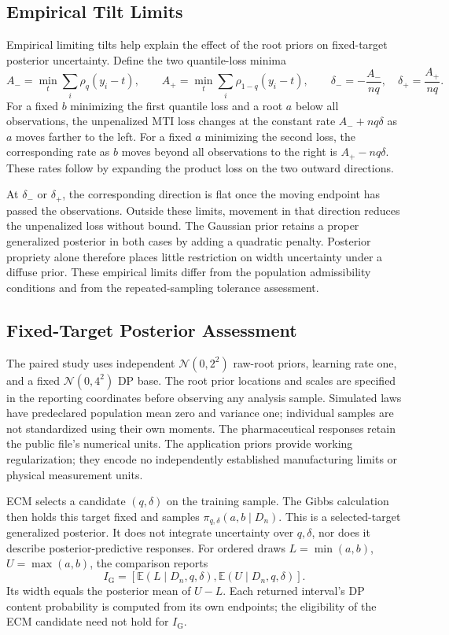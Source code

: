 \documentclass[11pt]{article}
\newcommand{\E}{\mathbb{E}}
\newcommand{\Normal}{\mathcal{N}}
\begin{document}
\subsection{Empirical Tilt Limits}
\label{sec:supp-mti-empirical-limits}

Empirical limiting tilts help explain the effect of the root priors on
fixed-target posterior uncertainty. Define the two quantile-loss minima
\[
A_- = \min_t\sum_i\rho_q(y_i-t),\qquad
A_+ = \min_t\sum_i\rho_{1-q}(y_i-t),\qquad
\delta_-=-\frac{A_-}{nq},\quad
\delta_+=\frac{A_+}{nq}.
\]
For a fixed \(b\) minimizing the first quantile loss and a root \(a\)
below all observations, the unpenalized MTI loss changes at the constant
rate \(A_-+nq\delta\) as \(a\) moves farther to the left. For a fixed
\(a\) minimizing the second loss, the corresponding rate as \(b\) moves
beyond all observations to the right is \(A_+-nq\delta\). These rates
follow by expanding the product loss on the two outward directions.

At \(\delta_-\) or \(\delta_+\), the corresponding direction is flat
once the moving endpoint has passed the observations. Outside these
limits, movement in that direction reduces the unpenalized loss without
bound. The Gaussian prior retains a proper generalized posterior in both
cases by adding a quadratic penalty. Posterior propriety alone therefore
places little restriction on width uncertainty under a diffuse prior.
These empirical limits differ from the population admissibility conditions
and from the repeated-sampling tolerance assessment.

\subsection{Fixed-Target Posterior Assessment}
\label{sec:supp-mti-posterior-assessment}

The paired study uses independent \(\Normal(0,2^2)\) raw-root priors,
learning rate one, and a fixed \(\Normal(0,4^2)\) DP base. The root prior
locations and scales are specified in the reporting coordinates before
observing any analysis sample. Simulated laws have predeclared population
mean zero and variance one; individual samples are not standardized using
their own moments. The pharmaceutical responses retain the public file's
numerical units. The application priors provide working regularization;
they encode no independently established manufacturing limits or physical
measurement units.

ECM selects a candidate \((q,\delta)\) on the training sample. The Gibbs
calculation then holds this target fixed and samples
\(\pi_{q,\delta}(a,b\mid D_n)\). This is a selected-target generalized
posterior. It does not integrate uncertainty over \(q,\delta\), nor does
it describe posterior-predictive responses. For ordered draws
\(L=\min(a,b)\), \(U=\max(a,b)\), the comparison reports
\[
 I_{\mathrm G}=[\E(L\mid D_n,q,\delta),\E(U\mid D_n,q,\delta)].
\]
Its width equals the posterior mean of \(U-L\). Each returned interval's
DP content probability is computed from its own endpoints; the eligibility
of the ECM candidate need not hold for \(I_{\mathrm G}\).
\end{document}

